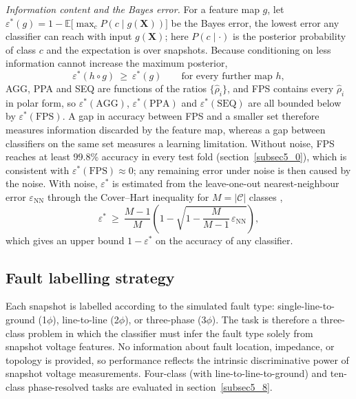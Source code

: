 \documentclass[11pt]{article}
\newenvironment{nw}{}{}
\newcommand{\hlnew}[1]{#1}
\begin{document}
\begin{nw}
\textit{Information content and the Bayes error.} For a feature map $g$, let $\varepsilon^\ast(g)=1-\mathbb{E}\big[\max_{c}P(c\mid g(\mathbf{X}))\big]$ be the Bayes error, the lowest error any classifier can reach with input $g(\mathbf{X})$; here $P(c\mid\cdot)$ is the posterior probability of class $c$ and the expectation is over snapshots. Because conditioning on less information cannot increase the maximum posterior,
\begin{equation}\label{eq_dpi}
\varepsilon^\ast(h\circ g)\ \ge\ \varepsilon^\ast(g)\qquad\text{for every further map } h ,
\end{equation}
AGG, PPA and SEQ are functions of the ratios $\{\hat\rho_i\}$, and FPS contains every $\hat\rho_i$ in polar form, so $\varepsilon^\ast(\mathrm{AGG})$, $\varepsilon^\ast(\mathrm{PPA})$ and $\varepsilon^\ast(\mathrm{SEQ})$ are all bounded below by $\varepsilon^\ast(\mathrm{FPS})$. A gap in accuracy between FPS and a smaller set therefore measures information discarded by the feature map, whereas a gap between classifiers on the same set measures a learning limitation. Without noise, FPS reaches at least 99.8\% accuracy in every test fold (section~\ref{subsec5_0}), which is consistent with $\varepsilon^\ast(\mathrm{FPS})\approx0$; any remaining error under noise is then caused by the noise. With noise, $\varepsilon^\ast$ is estimated from the leave-one-out nearest-neighbour error $\varepsilon_{\mathrm{NN}}$ through the Cover--Hart inequality for $M=|\mathcal{C}|$ classes \cite{coverhart1967,sekeh2020},
\begin{equation}\label{eq_ch}
\varepsilon^\ast\ \ge\ \frac{M-1}{M}\left(1-\sqrt{1-\frac{M}{M-1}\,\varepsilon_{\mathrm{NN}}}\right),
\end{equation}
which gives an upper bound $1-\varepsilon^\ast$ on the accuracy of any classifier.
\end{nw}

\subsection{Fault labelling strategy}\label{subsec3_2}

Each snapshot is labelled according to the simulated fault type: single-line-to-ground (1$\phi$), line-to-line (2$\phi$), or three-phase (3$\phi$). The task is therefore a three-class problem in which the classifier must infer the fault type solely from snapshot voltage features. No information about fault location, impedance, or topology is provided, so performance reflects the intrinsic discriminative power of snapshot voltage measurements. \hlnew{Four-class (with line-to-line-to-ground) and ten-class phase-resolved tasks are evaluated in section~\ref{subsec5_8}.}
\end{document}
